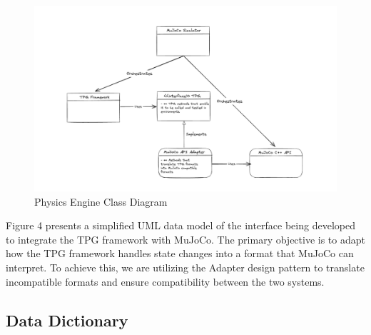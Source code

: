 \documentclass[12pt]{article}
\begin{document}
\begin{figure}[ht!]
  \begin{center}
   \includegraphics[scale=0.5]{ClassModel.png}
  \caption{Physics Engine Class Diagram}
  \label{Fig_ClassModel} 
  \end{center}
\end{figure}

Figure 4 presents a simplified UML data model of the interface being developed to integrate the TPG framework with MuJoCo. The primary objective is to adapt how the TPG framework handles state changes into a format that MuJoCo can interpret. To achieve this, we are utilizing the Adapter design pattern to translate incompatible formats and ensure compatibility between the two systems.

\subsection{Data Dictionary}
\end{document}
